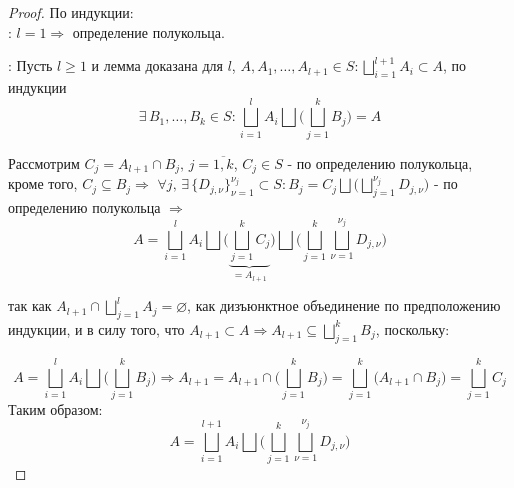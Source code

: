 \documentclass[12pt]{article}
\theoremstyle{definition}
\begin{document}
\begin{proof} По индукции:\\
	: $l = 1 \Rightarrow$ определение полукольца.
	
	: Пусть $l \geq 1$ и лемма доказана для $l$, $A, A_1, \dotsc, A_{l+1} \in S \colon \bigsqcup\limits_{i=1}^{l+1} A_i \subset A$, по индукции 
	$$
		\exists \, B_1, \dotsc, B_k \in S \colon \bigsqcup\limits_{i=1}^{l} A_i \bigsqcup \bigg(\bigsqcup\limits_{j=1}^{k}B_j\bigg) = A
	$$
	
	Рассмотрим $C_j = A_{l+1} \cap B_j, \, j = \overline{1,k}$, $C_j \in S$ - по определению полукольца, кроме того, $C_j \subseteq B_j \Rightarrow$ 
	$\forall j, \, \exists \, \{D_{j,\nu} \}_{\nu=1}^{\nu_j} \subset S \colon B_j = C_j \bigsqcup \bigg( \bigsqcup\limits_{j=1}^{\nu_j}D_{j,\nu} \bigg)$ - по определению полукольца $\Rightarrow$ 
	$$
		A = \bigsqcup\limits_{i=1}^{l}A_i\bigsqcup\bigg(\underbrace{\bigsqcup\limits_{j=1}^{k}C_j}_{= A_{l+1}} \bigg) \bigsqcup
		\bigg(\bigsqcup\limits_{j=1}^{k}\bigsqcup\limits_{\nu=1}^{\nu_j}D_{j,\nu} \bigg)
	$$
	
	так как $A_{l+1} \cap \bigsqcup\limits_{j=1}^{l}A_j = \varnothing$, как дизъюнктное объединение по предположению индукции, и в силу того, что $A_{l+1} \subset A \Rightarrow A_{l+1} \subseteq \bigsqcup\limits_{j=1}^{k} B_j$, поскольку:
	
	$$
		A = \bigsqcup\limits_{i=1}^{l} A_i \bigsqcup \bigg(\bigsqcup\limits_{j=1}^{k}B_j\bigg) \Rightarrow A_{l+1} = A_{l+1} \cap \Big(\bigsqcup\limits_{j=1}^{k} B_j\Big) = \bigsqcup\limits_{j=1}^{k} \Big(A_{l+1} \cap B_j\Big) = \bigsqcup\limits_{j=1}^{k} C_j
	$$
	Таким образом:
	$$
		A = \bigsqcup\limits_{i=1}^{l + 1}A_i\bigsqcup
		\bigg(\bigsqcup\limits_{j=1}^{k}\bigsqcup\limits_{\nu=1}^{\nu_j}D_{j,\nu} \bigg)
	$$
	
\end{proof}
\end{document}
